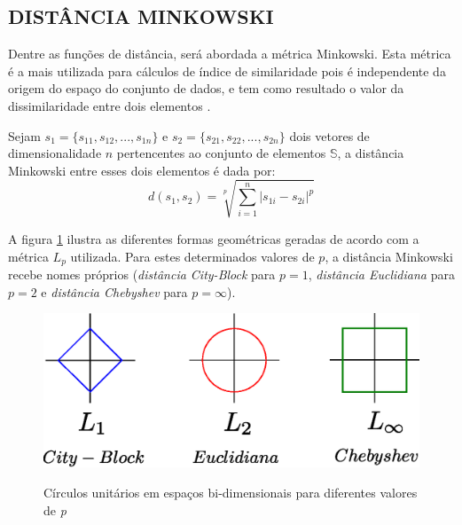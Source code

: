 \subsection{DISTÂNCIA MINKOWSKI}
Dentre as funções de distância, será abordada a métrica Minkowski. Esta métrica é a mais utilizada para cálculos de índice de similaridade
pois é independente da origem do espaço do conjunto de dados, e tem como resultado o valor da dissimilaridade entre dois elementos \cite{Jain1988}.
\begin{mydef}
\label{def:mink}
  Sejam $s_1 = \{s_{11},s_{12},...,s_{1n}\}$ e $s_2 = \{s_{21},s_{22},...,s_{2n}\}$ dois vetores de dimensionalidade $n$ pertencentes ao conjunto de
  elementos $\mathbb{S}$, a distância Minkowski entre esses dois elementos é dada por:
\begin{equation}
		d(s_1,s_2) = \sqrt[p]{\sum_{i=1}^{n}|s_{1i} - s_{2i}|^p}
\end{equation}
\end{mydef}

A figura \ref{fig:minko} ilustra as diferentes formas geométricas geradas de acordo com a métrica $L_p$ utilizada. Para estes determinados valores de $p$, a distância Minkowski recebe nomes
próprios (\textit{distância City-Block} para $p = 1$, \textit{distância Euclidiana} para $p = 2$ e \textit{distância Chebyshev} para $p = \infty$).

\begin{figure}[H]
\centering
\caption{Círculos unitários em espaços bi-dimensionais para diferentes valores de \textit{p}}
\includegraphics[width=.7\textwidth]{dados/figuras/minko.eps}
\label{fig:minko}
\end{figure}

